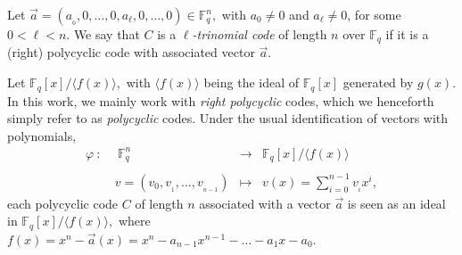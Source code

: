 \documentclass[12pt]{elsarticle}
\def\dsum #1#2{\displaystyle{\sum_{#1}^{#2}}}
\newcommand{\Fq}{\mathbb{F}_{q}}
\theoremstyle{break}
{\theorembodyfont{\upshape}
    \newtheorem{theorem}{Theorem}[section] %
    \newtheorem{lemma}[theorem]{Lemma} %
    \newtheorem{proposition}[theorem]{Proposition}
    \newtheorem{corollary}[theorem]{Corollary}
    \newtheorem{definition}[theorem]{Definition}
    \newtheorem{example}[theorem]{Example}
    \newtheorem{remark}[theorem]{Remark}
    \newtheorem{conjecture}[theorem]{Conjecture}
    \newtheorem*{proof}{{Proof}}
	\newtheorem*{notation}{Notation}
	\newtheorem*{main}{Cain Theorem}
	\newtheorem*{problem}{Problem}
}
\begin{document}
 \begin{definition}
    Let $\vec{a}=\left(a_{_0},0,\ldots, 0,a_{\ell}, 0, \ldots, 0\right)\in \Fq^{n},$ with $a_0\neq 0 $ and $ a_{\ell}\neq 0$, for some $ 0<\ell <n. $
    We say that $C$ is a \textit{$\ell$-trinomial code}  of length $n$ over $\Fq$ if it is a (right) polycyclic code with associated vector $\vec{a}.$
\end{definition}

Let $\Fq[x]/ \langle f(x)\rangle,$ with $ \langle f(x)\rangle $ being the  ideal of $\Fq[x]$ generated by $g(x).$ In this work, we mainly work with \textit{right polycyclic} codes, which we henceforth simply refer to as \textit{polycyclic} codes. Under the usual identification of vectors with polynomials, 
   	\begin{equation}\label{Realization}
  	\begin{array}{rccc}
  	\varphi \ : \ & \ \Fq^n &\longrightarrow & \Fq[x]/ \langle f(x)\rangle \\ & & & \\
  	  &v=(v_0, v_{_1},\ldots,v_{_{n-1}}) & \longmapsto &  v(x)=\dsum{i=0}{n-1} v_{_i} x^{i},  
  	\end{array}
  	\end{equation} 
each polycyclic code $C$ of length $n$  associated with a vector $\vec{a}$ is seen as an ideal    in  $ \Fq[x]/ \langle f(x)\rangle,$  where $f(x)=x^n-\vec{a}(x)=x^n-a_{n-1}x^{n-1}-\ldots-a_1x-a_0.$ 
\end{document}
